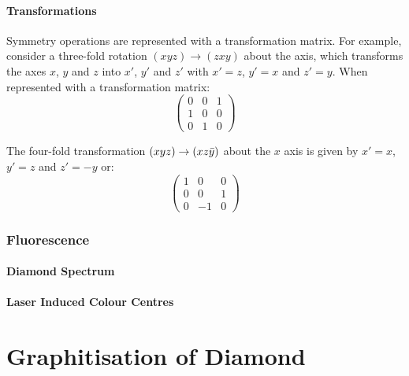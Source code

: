 \subsection{Transformations}
Symmetry operations are represented with a transformation matrix. For example, consider a three-fold rotation $\left(xyz\right)\rightarrow\left(zxy\right)$ about the \hkl[111] axis, which transforms the axes $x$, $y$ and $z$ into $x\prime$, $y\prime$ and $z\prime$ with $x\prime=z$, $y\prime=x$ and $z\prime=y$. When represented with a transformation matrix:
\begin{equation}
    \begin{pmatrix}
    0 & 0 & 1\\
    1 & 0 & 0\\
    0 & 1 & 0
    \end{pmatrix}
    \label{eq:three_fold_rotation_111}
\end{equation}

The four-fold transformation $\left(xyz\right)\rightarrow\left(xz\Bar{y}\right)$ about the $x$ axis is given by $x\prime=x$, $y\prime=z$ and $z\prime=-y$ or:
\begin{equation}
    \begin{pmatrix}
    1 & 0 & 0\\
    0 & 0 & 1\\
    0 & -1 & 0
    \end{pmatrix}
    \label{eq:four_fold_roatation_100}
\end{equation}


\section{Fluorescence}
\subsection{Diamond Spectrum}
\subsection{Laser Induced Colour Centres}

\part{Graphitisation of Diamond} %

\label{ch:laser} %


